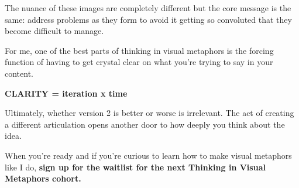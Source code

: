 \vspace{2mm}
\begin{center}
\begin{minipage}{0.92\textwidth}
\small
The nuance of these images are completely different but the core message is the same: address problems as they form to avoid it getting so convoluted that they become difficult to manage.

For me, one of the best parts of thinking in visual metaphors is the forcing function of having to get crystal clear on what you’re trying to say in your content.

\textbf{CLARITY = iteration x time}

Ultimately, whether version 2 is better or worse is irrelevant. The act of creating a different articulation opens another door to how deeply you think about the idea.

When you’re ready and if you’re curious to learn how to make visual metaphors like I do, \textbf{sign up for the waitlist for the next Thinking in Visual Metaphors cohort. }
\end{minipage}
\end{center}
\vspace*{\fill}